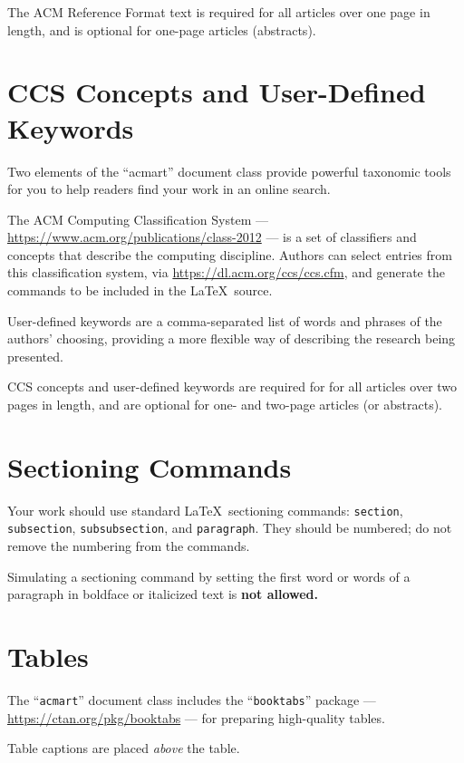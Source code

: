 \documentclass[sigconf, authordraft]{acmart}
\begin{document}
	The ACM Reference Format text is required for all articles over one page in
	length, and is optional for one-page articles (abstracts).

	\section{CCS Concepts and User-Defined Keywords}


	Two elements of the ``acmart'' document class provide powerful taxonomic tools
	for you to help readers find your work in an online search.

	The ACM Computing Classification System --- \url{https://www.acm.org/publications/class-2012}
	--- is a set of classifiers and concepts that describe the computing discipline.
	Authors can select entries from this classification system, via \url{https://dl.acm.org/ccs/ccs.cfm},
	and generate the commands to be included in the \LaTeX\ source.

	User-defined keywords are a comma-separated list of words and phrases of the
	authors' choosing, providing a more flexible way of describing the research
	being presented.

	CCS concepts and user-defined keywords are required for for all articles over
	two pages in length, and are optional for one- and two-page articles (or abstracts).

	\section{Sectioning Commands}


	Your work should use standard \LaTeX\ sectioning commands: \verb|section|,
	\verb|subsection|, \verb|subsubsection|, and \verb|paragraph|. They should be numbered;
	do not remove the numbering from the commands.

	Simulating a sectioning command by setting the first word or words of a
	paragraph in boldface or italicized text is {\bfseries not allowed.}

	\section{Tables}


	The ``\verb|acmart|'' document class includes the ``\verb|booktabs|'' package ---
	\url{https://ctan.org/pkg/booktabs} --- for preparing high-quality tables.

	Table captions are placed {\itshape above} the table.
\end{document}
